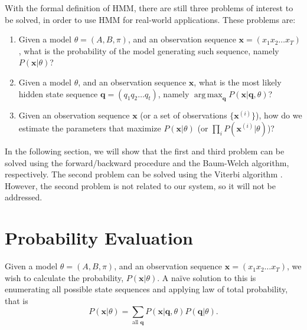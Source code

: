 \documentclass[12pt,final,twoside]{report}
\theoremstyle{plain}
\theoremstyle{definition}
\theoremstyle{remark}
\DeclareMathOperator*{\argmax}{arg\,max}
\begin{document}
With the formal definition of HMM, there are still three problems of interest to be solved, in order to use HMM for real-world applications. These problems are:
\begin{enumerate}
  \item Given a model $\theta=(A, B, \pi)$, and an observation sequence $\mathbf{x} = (x_1 x_2 \dots x_T)$, what is the probability of the model generating such sequence, namely $P(\mathbf{x}|\theta)$?
  \item Given a model $\theta$, and an observation sequence $\mathbf{x}$, what is the most likely hidden state sequence $\mathbf{q} = (q_1 q_2 \dots q_t)$, namely $\argmax_{\mathbf{q}}P(\mathbf{x}|\mathbf{q},\theta)$?
  \item Given an observation sequence $\mathbf{x}$ (or a set of observations $\{\mathbf{x}^{(i)}\}$), how do we estimate the parameters that maximize $P(\mathbf{x}|\theta)$ (or $\prod_{i} P(\mathbf{x}^{(i)}|\theta) $)?
\end{enumerate}

In the following section, we will show that the first and third problem can be solved using the forward/backward procedure and the Baum-Welch algorithm, respectively. The second problem can be solved using the Viterbi algorithm \cite{forney_viterbi_1973}. However, the second problem is not related to our system, so it will not be addressed.

\section{Probability Evaluation}
Given a model $\theta=(A, B, \pi)$, and an observation sequence $\mathbf{x} = (x_1 x_2 \dots x_T)$, we wish to calculate the probability, $P(\mathbf{x}|\theta)$. A na\"ive solution to this is enumerating all possible state sequences and applying law of total probability, that is
\begin{equation}
  P(\mathbf{x}|\theta) = \sum_{\text{all } \mathbf{q}} P(\mathbf{x}|\mathbf{q},\theta) P(\mathbf{q}|\theta) .
\end{equation}
\end{document}
